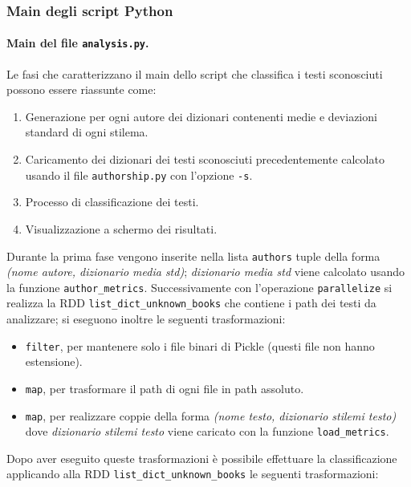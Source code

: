 \documentclass[titlepage]{article}
\begin{document}
\newpage
\subsubsection{Main degli script Python}
\paragraph{Main del file \texttt{analysis.py}.}
Le fasi che caratterizzano il main dello script che classifica i testi sconosciuti possono essere riassunte come:
\begin{enumerate}
    \item Generazione per ogni autore dei dizionari contenenti medie e deviazioni standard di ogni stilema.
    \item Caricamento dei dizionari dei testi sconosciuti precedentemente calcolato usando il file \texttt{authorship.py} con l'opzione \texttt{-s}.
    \item Processo di classificazione dei testi.
    \item Visualizzazione a schermo dei risultati.
\end{enumerate}
Durante la prima fase vengono inserite nella lista \texttt{authors} tuple della forma \textit{(nome autore, dizionario media std)}; \textit{dizionario media std} viene calcolato usando la funzione \texttt{author\_metrics}. Successivamente con l'operazione \texttt{parallelize} si realizza la RDD \texttt{list\_dict\_unknown\_books} che contiene i path dei testi da analizzare; si eseguono inoltre le seguenti trasformazioni:
\begin{itemize}
    \item \texttt{filter}, per mantenere solo i file binari di Pickle (questi file non hanno estensione).
    \item \texttt{map}, per trasformare il path di ogni file in path assoluto.
    \item \texttt{map}, per realizzare coppie della forma \textit{(nome testo, dizionario stilemi testo)} dove \textit{dizionario stilemi testo} viene caricato con la funzione \texttt{load\_metrics}.
\end{itemize}
Dopo aver eseguito queste trasformazioni è possibile effettuare la classificazione applicando alla RDD \texttt{list\_dict\_unknown\_books} le seguenti trasformazioni:
\end{document}
